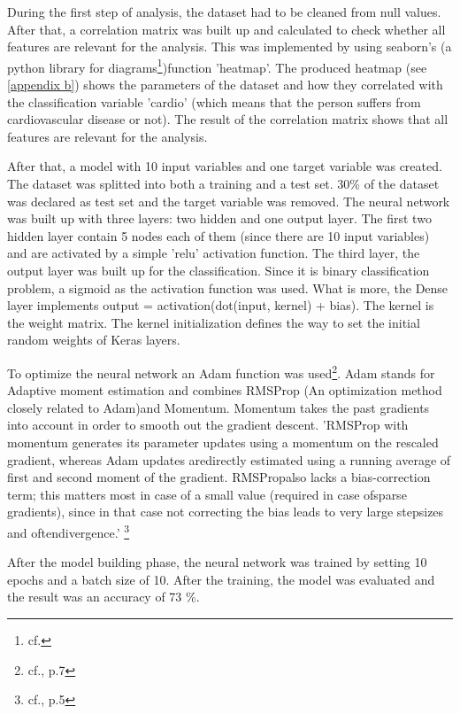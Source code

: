 During the first step of analysis, the dataset had to be cleaned from null values. After that, a correlation matrix was built up and calculated to check whether all features are relevant for the analysis. This was implemented by using seaborn's (a python library for diagrams\footnote{cf.\autocite{seaborn}})function 'heatmap'. The produced heatmap (see \ref{appendix b}) shows the parameters of the dataset and how they correlated with the classification variable 'cardio' (which means that the person suffers from cardiovascular disease or not). The result of the correlation matrix shows that all features are relevant for the analysis.

After that, a model with 10 input variables and one target variable was created. The dataset was splitted into both a training and a test set. 30\% of the dataset was declared as test set and the target variable was removed. 
The neural network was built up with three layers: two hidden and one output layer. The first two hidden layer contain 5 nodes each of them (since there are 10 input variables) and are activated by a simple 'relu' activation function. The third layer, the output layer was built up for the classification. Since it is binary classification problem, a sigmoid as the activation function was used. What is more, the Dense layer implements output = activation(dot(input, kernel) + bias). The kernel is the weight matrix. The kernel initialization defines the way to set the initial random weights of Keras layers.

To optimize the neural network an Adam function was used\footnote{cf.\autocite{adam}, p.7}. Adam stands for Adaptive moment estimation and combines RMSProp (An optimization method closely related to Adam)and Momentum. Momentum takes the past gradients into account in order to smooth out the gradient descent.
'RMSProp with momentum generates its parameter updates using a momentum on the rescaled gradient, whereas Adam updates aredirectly estimated using a running average of first and second moment of the gradient. RMSPropalso lacks a bias-correction term; this matters most in case of a small value \textbeta (required in case ofsparse gradients), since in that case not correcting the bias leads to very large stepsizes and oftendivergence.' \footnote{cf.\autocite{adam}, p.5}

After the model building phase, the neural network was trained by setting 10 epochs and a batch size of 10. 
After the training, the model was evaluated and the result was an accuracy of 73 \%.


